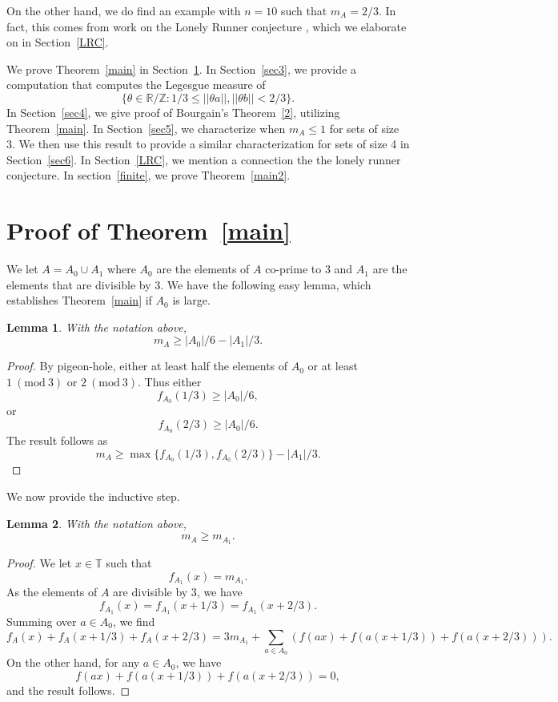 \documentclass[12pt,reqno]{amsart}
\theoremstyle{dotless}
\newtheorem{lemma}{Lemma}
\newcommand{\Mod}[1]{\ (\mathrm{mod}\ #1)}
\begin{document}
On the other hand, we do find an example with $n=10$ such that $m_A = 2/3$. In fact, this comes from work on the Lonely Runner conjecture \cite{BHK}, which we elaborate on in Section~\ref{LRC}. 

We prove Theorem~\ref{main} in Section~\ref{sec2}. In Section~\ref{sec3}, we provide a computation that computes the Legesgue measure of 
$$\{\theta \in \mathbb{R} / \mathbb{Z} : 1/3 \leq ||\theta a || , ||\theta b || < 2/3\}.$$
In Section~\ref{sec4}, we give proof of Bourgain's Theorem~\ref{2}, utilizing Theorem~\ref{main}. In Section~\ref{sec5}, we characterize when $m_A \leq 1$ for sets of size 3. We then use this result to provide a similar characterization for sets of size 4 in Section~\ref{sec6}. In Section~\ref{LRC}, we mention a connection the the lonely runner conjecture. In section~\ref{finite}, we prove Theorem~\ref{main2}.



\section{Proof of Theorem~\ref{main}}\label{sec2}

We let $A = A_0 \cup A_1$ where $A_0$ are the elements of $A$ co-prime to $3$ and $A_1$ are the elements that are divisible by 3. We have the following easy lemma, which establishes Theorem~\ref{main} if $A_0$ is large. 

\begin{lemma}\label{lem1} 
With the notation above,
$$m_A \geq |A_0|/6 - |A_1|/3.$$
\end{lemma}
\begin{proof}
By pigeon-hole, either at least half the elements of $A_0$ or at least $1 \Mod 3$ or $2\Mod3$. Thus either
$$f_{A_0}(1/3) \geq |A_0|/6,$$
or 
$$f_{A_0}(2/3) \geq |A_0|/6.$$
The result follows as 
$$m_A \geq \max\{ f_{A_0}(1/3) , f_{A_0}(2/3)\} - |A_1|/3.$$




\end{proof}

We now provide the inductive step. 

\begin{lemma}\label{lem2} With the notation above, 
$$m_A \geq m_{A_1}.$$
\end{lemma}
\begin{proof}
We let $x \in \mathbb{T}$ such that 
$$f_{A_1} (x) = m_{A_1}.$$
As the elements of $A$ are divisible by 3, we have
$$f_{A_1}(x) = f_{A_1}(x+1/3) = f_{A_1}(x+2/3) .$$
Summing over $a \in A_0$, we find 
$$f_A(x)  + f_A(x+1/3) + f_A(x+2/3) = 3 m_{A_1} + \sum_{a \in A_0} \left(f(ax) + f(a(x+1/3)) + f(a(x+2/3)) \right).$$
On the other hand, for any $a \in A_0$, we have
$$f(ax) + f(a(x+1/3)) + f(a(x+2/3)) = 0 ,$$
and the result follows.
\end{proof} 
\end{document}
